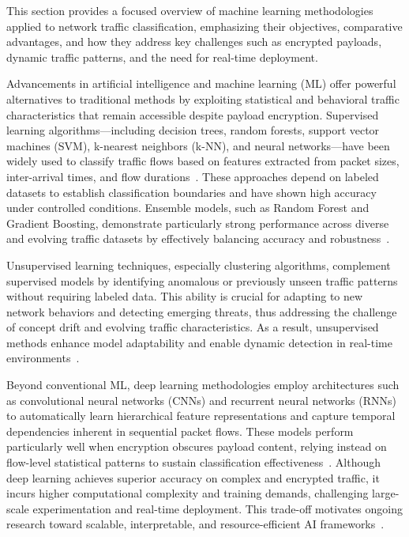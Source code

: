 \documentclass[sigconf]{acmart}
\begin{document}
This section provides a focused overview of machine learning methodologies applied to network traffic classification, emphasizing their objectives, comparative advantages, and how they address key challenges such as encrypted payloads, dynamic traffic patterns, and the need for real-time deployment.

Advancements in artificial intelligence and machine learning (ML) offer powerful alternatives to traditional methods by exploiting statistical and behavioral traffic characteristics that remain accessible despite payload encryption. Supervised learning algorithms—including decision trees, random forests, support vector machines (SVM), k-nearest neighbors (k-NN), and neural networks—have been widely used to classify traffic flows based on features extracted from packet sizes, inter-arrival times, and flow durations~\cite{ref51}. These approaches depend on labeled datasets to establish classification boundaries and have shown high accuracy under controlled conditions. Ensemble models, such as Random Forest and Gradient Boosting, demonstrate particularly strong performance across diverse and evolving traffic datasets by effectively balancing accuracy and robustness~\cite{ref51}.

Unsupervised learning techniques, especially clustering algorithms, complement supervised models by identifying anomalous or previously unseen traffic patterns without requiring labeled data. This ability is crucial for adapting to new network behaviors and detecting emerging threats, thus addressing the challenge of concept drift and evolving traffic characteristics. As a result, unsupervised methods enhance model adaptability and enable dynamic detection in real-time environments~\cite{ref51}.

Beyond conventional ML, deep learning methodologies employ architectures such as convolutional neural networks (CNNs) and recurrent neural networks (RNNs) to automatically learn hierarchical feature representations and capture temporal dependencies inherent in sequential packet flows. These models perform particularly well when encryption obscures payload content, relying instead on flow-level statistical patterns to sustain classification effectiveness~\cite{ref1,ref6,ref51}. Although deep learning achieves superior accuracy on complex and encrypted traffic, it incurs higher computational complexity and training demands, challenging large-scale experimentation and real-time deployment. This trade-off motivates ongoing research toward scalable, interpretable, and resource-efficient AI frameworks~\cite{ref51}.
\end{document}
